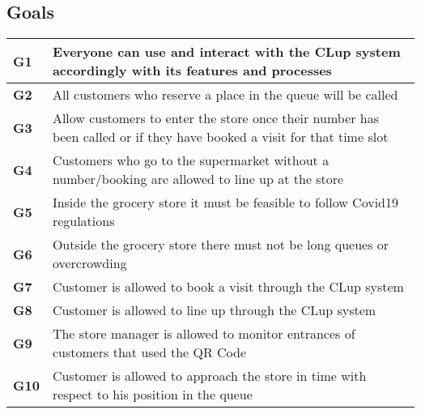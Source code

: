 \subsection{Goals}
\begin{center}
    {\renewcommand{\arraystretch}{2}
    \begin{tabular}{L{2cm}L{12cm}}
        \hline
        \textbf{G1} & Everyone can use and interact with the CLup system accordingly with its features and processes \\
        \hline
        \textbf{G2} & All customers who reserve a place in the queue will be called \\
        \hline
        \textbf{G3} & Allow customers to enter the store once their number has been called or if they have booked a visit for that time slot \\
        \hline
        \textbf{G4} & Customers who go to the supermarket without a number/booking are allowed to line up at the store \\
        \hline
        \textbf{G5} & Inside the grocery store it must be feasible to follow Covid19 regulations \\
        \hline
        \textbf{G6} & Outside the grocery store there must not be long queues or overcrowding \\
        \hline
        \textbf{G7} & Customer is allowed to book a visit through the CLup system \\
        \hline
        \textbf{G8} & Customer is allowed to line up through the CLup system \\
        \hline
        \textbf{G9} & The store manager is allowed to monitor entrances of customers that used the QR Code \\
        \hline
        \textbf{G10} & Customer is allowed to approach the store in time with respect to his position in the queue \\
        \hline
    \end{tabular}}
\end{center}